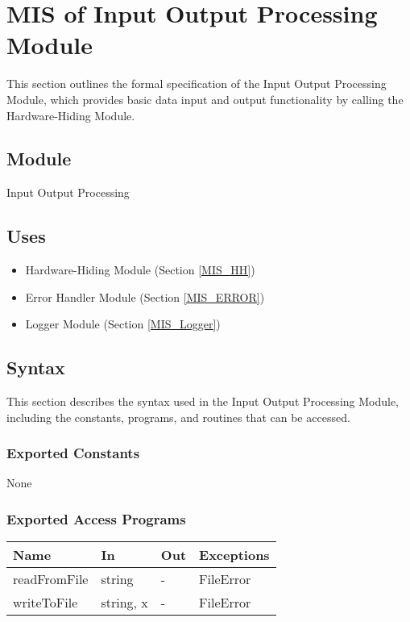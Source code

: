\documentclass[12pt, titlepage]{article}
\begin{document}
\section{MIS of Input Output Processing Module} \label{MIS_IO}

This section outlines the formal specification of the Input Output Processing
Module, which provides basic data input and output functionality by calling the
Hardware-Hiding Module.

\subsection{Module}

Input Output Processing

\subsection{Uses}

\begin{itemize}
\item Hardware-Hiding Module (Section \ref{MIS_HH})
\item Error Handler Module (Section \ref{MIS_ERROR})
\item Logger Module (Section \ref{MIS_Logger})
\end{itemize}

\subsection{Syntax}

This section describes the syntax used in the Input Output Processing Module,
including the constants, programs, and routines that can be accessed.

\subsubsection{Exported Constants}

None

\subsubsection{Exported Access Programs}

\begin{center}
\begin{tabular}{p{3cm} p{4cm} p{4cm} p{2cm}}
\hline
\textbf{Name} & \textbf{In} & \textbf{Out} & \textbf{Exceptions} \\
\hline
readFromFile & string & - & FileError \\
writeToFile & string, x & - & FileError \\
\hline
\end{tabular}
\end{center}
\end{document}
